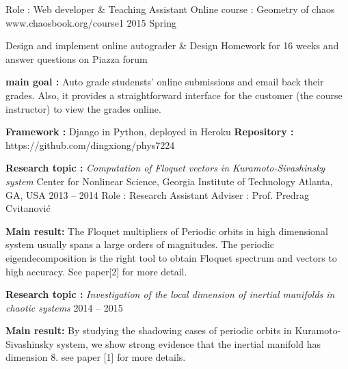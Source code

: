 


\begin{cventries}


\cventry
{Role : Web developer \& Teaching Assistant}
{Online course : Geometry of chaos}
{www.chaosbook.org/course1}
{2015 Spring}
{
  \begin{cvitems}
    \item {Design and implement online autograder \& Design Homework for 16 weeks and answer questions on
        Piazza forum}
    \item {\textbf{main goal :} Auto grade studensts' online submissions and email back their grades. Also, 
      it provides a straightforward interface for the customer (the course instructor)
      to view the grades online.}
    \item {\textbf{Framework :} Django in Python, deployed in Heroku \quad
      \textbf{Repository :} {\color{red} https://github.com/dingxiong/phys7224} 
    }
  \end{cvitems}
}

\cventrymore
{\textbf{Research topic :} \emph{Computation of Floquet vectors in Kuramoto-Sivashinsky system}}
{Center for Nonlinear Science, Georgia Institute of Technology}
{Atlanta, GA, USA}
{2013 -- 2014}
{Role : Research Assistant \quad Adviser : Prof. Predrag Cvitanovi\'c }
{
  \begin{cvitems}
  \item {\textbf{Main result:} The Floquet multipliers of Periodic orbits in high dimensional system 
      usually spans a large orders of magnitudes. The periodic eigendecomposition is the right tool
      to obtain Floquet spectrum and vectors to high accuracy. See paper[2] for more detail.
    }
  \end{cvitems}
}

\cventry
{\textbf{Research topic :} \emph{Investigation of the local dimension of inertial manifolds in chaotic systems}}
{}{}
{2014 -- 2015}
{
  \begin{cvitems}
    \item {\textbf{Main result:} By studying the shadowing cases of periodic orbits in
        Kuramoto-Sivashinsky system, we show strong evidence that the inertial manifold has
        dimension 8. see paper [1] for more details.}
  \end{cvitems}
}


\end{cventries}
